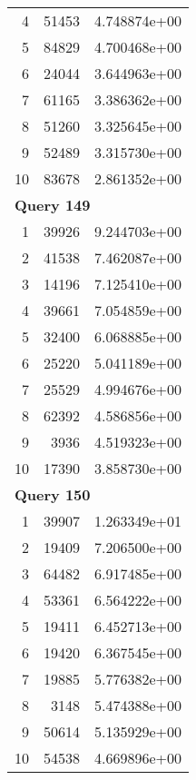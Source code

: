 \begin{longtable}[{p}]{@{}rrp{}@{}}
4 & 51453 & 4.748874e+00 \\
5 & 84829 & 4.700468e+00 \\
6 & 24044 & 3.644963e+00 \\
7 & 61165 & 3.386362e+00 \\
8 & 51260 & 3.325645e+00 \\
9 & 52489 & 3.315730e+00 \\
10 & 83678 & 2.861352e+00 \\
\midrule
\multicolumn{3}{l}{\bfseries Query 149} \\
1 & 39926 & 9.244703e+00 \\
2 & 41538 & 7.462087e+00 \\
3 & 14196 & 7.125410e+00 \\
4 & 39661 & 7.054859e+00 \\
5 & 32400 & 6.068885e+00 \\
6 & 25220 & 5.041189e+00 \\
7 & 25529 & 4.994676e+00 \\
8 & 62392 & 4.586856e+00 \\
9 & 3936 & 4.519323e+00 \\
10 & 17390 & 3.858730e+00 \\
\midrule
\multicolumn{3}{l}{\bfseries Query 150} \\
1 & 39907 & 1.263349e+01 \\
2 & 19409 & 7.206500e+00 \\
3 & 64482 & 6.917485e+00 \\
4 & 53361 & 6.564222e+00 \\
5 & 19411 & 6.452713e+00 \\
6 & 19420 & 6.367545e+00 \\
7 & 19885 & 5.776382e+00 \\
8 & 3148 & 5.474388e+00 \\
9 & 50614 & 5.135929e+00 \\
10 & 54538 & 4.669896e+00 \\
\end{longtable}

